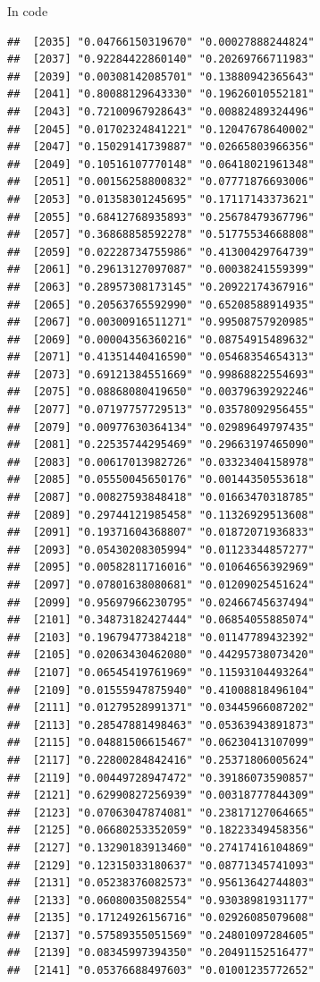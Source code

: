 \documentclass[ignorenonframetext,]{beamer}
\begin{document}
\begin{frame}[fragile]{In code}
\begin{verbatim}
##  [2035] "0.04766150319670" "0.00027888244824"
##  [2037] "0.92284422860140" "0.20269766711983"
##  [2039] "0.00308142085701" "0.13880942365643"
##  [2041] "0.80088129643330" "0.19626010552181"
##  [2043] "0.72100967928643" "0.00882489324496"
##  [2045] "0.01702324841221" "0.12047678640002"
##  [2047] "0.15029141739887" "0.02665803966356"
##  [2049] "0.10516107770148" "0.06418021961348"
##  [2051] "0.00156258800832" "0.07771876693006"
##  [2053] "0.01358301245695" "0.17117143373621"
##  [2055] "0.68412768935893" "0.25678479367796"
##  [2057] "0.36868858592278" "0.51775534668808"
##  [2059] "0.02228734755986" "0.41300429764739"
##  [2061] "0.29613127097087" "0.00038241559399"
##  [2063] "0.28957308173145" "0.20922174367916"
##  [2065] "0.20563765592990" "0.65208588914935"
##  [2067] "0.00300916511271" "0.99508757920985"
##  [2069] "0.00004356360216" "0.08754915489632"
##  [2071] "0.41351440416590" "0.05468354654313"
##  [2073] "0.69121384551669" "0.99868822554693"
##  [2075] "0.08868080419650" "0.00379639292246"
##  [2077] "0.07197757729513" "0.03578092956455"
##  [2079] "0.00977630364134" "0.02989649797435"
##  [2081] "0.22535744295469" "0.29663197465090"
##  [2083] "0.00617013982726" "0.03323404158978"
##  [2085] "0.05550045650176" "0.00144350553618"
##  [2087] "0.00827593848418" "0.01663470318785"
##  [2089] "0.29744121985458" "0.11326929513608"
##  [2091] "0.19371604368807" "0.01872071936833"
##  [2093] "0.05430208305994" "0.01123344857277"
##  [2095] "0.00582811716016" "0.01064656392969"
##  [2097] "0.07801638080681" "0.01209025451624"
##  [2099] "0.95697966230795" "0.02466745637494"
##  [2101] "0.34873182427444" "0.06854055885074"
##  [2103] "0.19679477384218" "0.01147789432392"
##  [2105] "0.02063430462080" "0.44295738073420"
##  [2107] "0.06545419761969" "0.11593104493264"
##  [2109] "0.01555947875940" "0.41008818496104"
##  [2111] "0.01279528991371" "0.03445966087202"
##  [2113] "0.28547881498463" "0.05363943891873"
##  [2115] "0.04881506615467" "0.06230413107099"
##  [2117] "0.22800284842416" "0.25371806005624"
##  [2119] "0.00449728947472" "0.39186073590857"
##  [2121] "0.62990827256939" "0.00318777844309"
##  [2123] "0.07063047874081" "0.23817127064665"
##  [2125] "0.06680253352059" "0.18223349458356"
##  [2127] "0.13290183913460" "0.27417416104869"
##  [2129] "0.12315033180637" "0.08771345741093"
##  [2131] "0.05238376082573" "0.95613642744803"
##  [2133] "0.06080035082554" "0.93038981931177"
##  [2135] "0.17124926156716" "0.02926085079608"
##  [2137] "0.57589355051569" "0.24801097284605"
##  [2139] "0.08345997394350" "0.20491152516477"
##  [2141] "0.05376688497603" "0.01001235772652"

\end{verbatim}
\end{frame}
\end{document}
